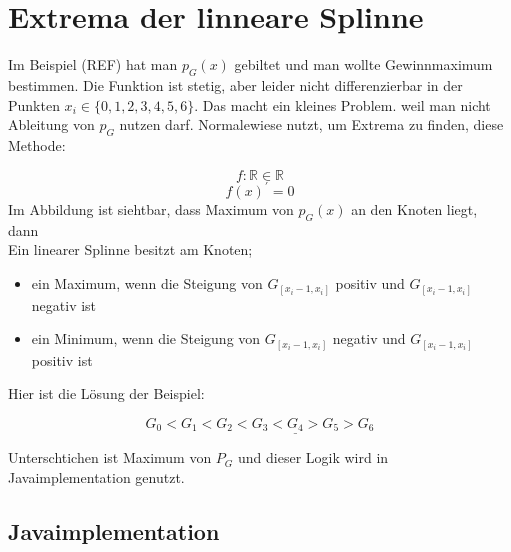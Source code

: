 \section{Extrema der linneare Splinne}
Im Beispiel (REF) hat man $p_G(x)$ gebiltet und man wollte Gewinnmaximum bestimmen. Die Funktion ist stetig, aber leider nicht differenzierbar in der Punkten $ x_i \in \{0, 1, 2 ,3 ,4 ,5 ,6 \}$.
Das macht ein kleines Problem. weil man nicht Ableitung von $p_G$ nutzen darf.
Normalewiese nutzt, um Extrema zu finden, diese Methode:

 $$f: \mathbb{R} \in \mathbb{R}$$
$$ f(x)^{\prime} = 0$$
Im Abbildung ist siehtbar, dass Maximum von $p_G(x)$ an den Knoten liegt, dann\\
Ein linearer Splinne besitzt am Knoten;
\begin{itemize}
\item ein Maximum, wenn die Steigung von $G_{[x_i -1, x_i]}$ positiv und $G_{[x_i -1, x_i]}$ negativ ist

\item ein Minimum, wenn die Steigung von $G_{[x_i -1, x_i]}$ negativ und $G_{[x_i -1, x_i]}$ positiv ist
\end{itemize}

Hier ist die Lösung der Beispiel:

$$G_0 < G_1 <G_2 <G_3 <\underline{G_4}> G_5 > G_6$$

Unterschtichen ist Maximum von $P_G$ und dieser Logik wird in Javaimplementation genutzt.  
\subsection{Javaimplementation}

